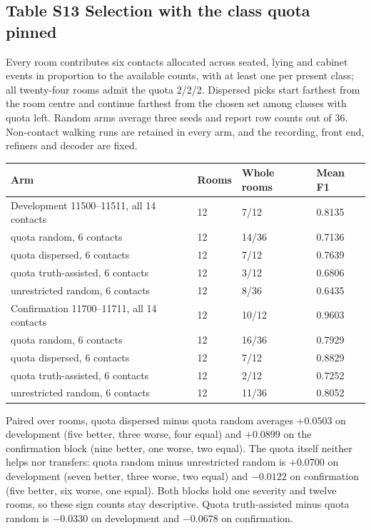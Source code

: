 \documentclass[10pt,letterpaper]{article}
\begin{document}
\begin{minipage}{\linewidth}\subsection*{Table S13 Selection with the class quota pinned}
Every room contributes six contacts allocated across seated, lying and
cabinet events in proportion to the available counts, with at least one
per present class; all twenty-four rooms admit the quota 2/2/2. Dispersed
picks start farthest from the room centre and continue farthest from the
chosen set among classes with quota left. Random arms average three seeds
and report row counts out of 36. Non-contact walking runs are retained in
every arm, and the recording, front end, refiners and decoder are fixed.

\begin{center}\small\begin{tabular}{@{}p{}p{}p{}p{}@{}}\toprule
\textbf{Arm} & \textbf{Rooms} & \textbf{Whole rooms} & \textbf{Mean F1} \\ \midrule
Development 11500--11511, all 14 contacts & 12 & 7/12 & 0.8135 \\
\quad quota random, 6 contacts & 12 & 14/36 & 0.7136 \\
\quad quota dispersed, 6 contacts & 12 & 7/12 & 0.7639 \\
\quad quota truth-assisted, 6 contacts & 12 & 3/12 & 0.6806 \\
\quad unrestricted random, 6 contacts & 12 & 8/36 & 0.6435 \\
Confirmation 11700--11711, all 14 contacts & 12 & 10/12 & 0.9603 \\
\quad quota random, 6 contacts & 12 & 16/36 & 0.7929 \\
\quad quota dispersed, 6 contacts & 12 & 7/12 & 0.8829 \\
\quad quota truth-assisted, 6 contacts & 12 & 2/12 & 0.7252 \\
\quad unrestricted random, 6 contacts & 12 & 11/36 & 0.8052 \\
\bottomrule\end{tabular}\end{center}

Paired over rooms, quota dispersed minus quota random averages $+0.0503$
on development (five better, three worse, four equal) and $+0.0899$ on
the confirmation block (nine better, one worse, two equal). The quota
itself neither helps nor transfers: quota random minus unrestricted random
is $+0.0700$ on development (seven better, three worse, two equal) and
$-0.0122$ on confirmation (five better, six worse, one equal). Both blocks
hold one severity and twelve rooms, so these sign counts stay descriptive.
Quota truth-assisted minus quota random is $-0.0330$ on development and
$-0.0678$ on confirmation.
\end{minipage}\par\medskip
\end{document}
